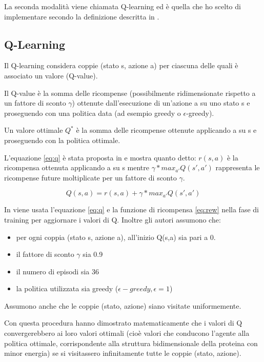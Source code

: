 \documentclass[conference]{IEEEtran}
\begin{document}
La seconda modalità viene chiamata Q-learning ed è quella che ho scelto di implementare secondo la definizione descritta in \cite{CzibulaPFP}.

\subsection{Q-Learning}

Il Q-learning considera coppie (stato s, azione a) per ciascuna delle quali è associato un valore (Q-value).

Il Q-value è la somma delle ricompense (possibilmente ridimensionate rispetto a un fattore di sconto $\gamma$) ottenute dall'esecuzione di un'azione a su uno stato s e proseguendo con una politica data (ad esempio greedy o $\epsilon$-greedy).

Un valore ottimale $Q^*$ è la somma delle ricompense ottenute applicando a su s e proseguendo con la politica ottimale.

L'equazione \ref{eq:q} è stata proposta in \cite{CzibulaPFP} e mostra quanto detto: $r(s,a)$ è la ricompensa ottenuta applicando a su s mentre $\gamma * max_{a'} Q(s', a')$ rappresenta le ricompense future moltiplicate per un fattore di sconto $\gamma$.

\begin{equation}
\label{eq:q}
Q(s,a) = r(s,a) + \gamma * max_{a'} Q(s', a')
\end{equation}

In \cite{CzibulaPFP} viene usata l'equazione \ref{eq:q} e la funzione di ricompensa \ref{eq:rew} nella fase di training per aggiornare i valori di Q. Inoltre gli autori assumono che:

\begin{itemize}
 \item per ogni coppia (stato s, azione a), all'inizio Q(s,a) sia pari a 0.
 \item il fattore di sconto $\gamma$ sia 0.9
 \item il numero di episodi sia 36
 \item la politica utilizzata sia greedy ($\epsilon-greedy, \epsilon = 1$)
\end{itemize}

Assumono anche che le coppie (stato, azione) siano visitate uniformemente.

Con questa procedura hanno dimostrato matematicamente che i valori di Q convergerebbero ai loro valori ottimali (cioè valori che conducono l'agente alla politica ottimale, corrispondente alla struttura bidimensionale della proteina con minor energia) se si visitassero infinitamente tutte le coppie (stato, azione).
\end{document}
